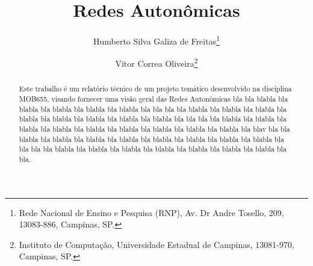 \documentclass[11pt,twoside]{article}
\begin{document}
% 

%



\TRMakeCover


%
\pagestyle{myheadings}

%
\title{Redes Autonômicas}

\author{Humberto Silva Galiza de Freitas\thanks{Rede Nacional de Ensino e Pesquisa (RNP), 
Av. Dr Andre Tosello, 209, 13083-886, Campinas, SP.} \and
Vitor Correa Oliveira\thanks{Instituto  de Computação, Universidade
Estadual  de Campinas, 13081-970, Campinas, SP. }}

\date{}

\maketitle


\begin{abstract} 
  Este trabalho é um relatório técnico de um projeto temático 
  desenvolvido na disciplina MOB655, visando fornecer uma visão geral
  das Redes Autonômicas bla bla blabla bla blabla bla blabla bla blabla bla blabla bla bla
  bla bla blabla bla blabla bla blabla bla blabla bla blabla bla blabla bla blabla bla blabla bla bla
  bla bla blabla bla blabla bla blabla bla blabla bla blabla bla blabla bla blabla bla blabla bla blabla bla blav
  bla bla blabla bla blabla bla blabla bla blabla bla blabla bla blabla bla blabla bla blabla bla bla
  bla bla blabla bla blabla bla blabla bla blabla bla blabla bla blabla bla blabla bla bla.
\end{abstract}
\end{document}
